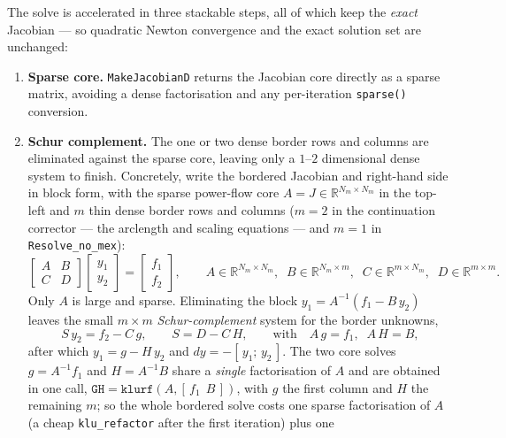\documentclass[11pt,a4paper]{article}
\newcommand{\code}[1]{\texttt{#1}}
\begin{document}
The solve is accelerated in three stackable steps, all of which keep the \emph{exact}
Jacobian --- so quadratic Newton convergence and the exact solution set are unchanged:
\begin{enumerate}[leftmargin=1.6em]
  \item \textbf{Sparse core.} \code{MakeJacobianD} returns the Jacobian core directly as a
        sparse matrix, avoiding a dense factorisation and any per-iteration \code{sparse()}
        conversion.
  \item \textbf{Schur complement.} The one or two dense border rows and columns are
        eliminated against the sparse core, leaving only a $1$--$2$ dimensional dense
        system to finish. Concretely, write the bordered Jacobian and right-hand side in
        block form, with the sparse power-flow core $A=J\in\mathbb{R}^{N_m\times N_m}$ in the
        top-left and $m$ thin dense border rows and columns ($m=2$ in the continuation
        corrector --- the arclength and scaling equations --- and $m=1$ in
        \code{Resolve_no_mex}):
        \[
          \begin{bmatrix} A & B\\[2pt] C & D \end{bmatrix}
          \begin{bmatrix} y_1\\[2pt] y_2 \end{bmatrix}
          =
          \begin{bmatrix} f_1\\[2pt] f_2 \end{bmatrix},
          \qquad
          A\in\mathbb{R}^{N_m\times N_m},\;\;
          B\in\mathbb{R}^{N_m\times m},\;\;
          C\in\mathbb{R}^{m\times N_m},\;\;
          D\in\mathbb{R}^{m\times m}.
        \]
        Only $A$ is large and sparse. Eliminating the block $y_1=A^{-1}(f_1-B\,y_2)$ leaves
        the small $m\times m$ \emph{Schur-complement} system for the border unknowns,
        \[
          S\,y_2 = f_2 - C\,g,
          \qquad
          S = D - C\,H,
          \qquad\text{with}\quad
          A\,g = f_1,\;\; A\,H = B,
        \]
        after which $y_1 = g - H\,y_2$ and $dy=-[\,y_1;\,y_2\,]$. The two core solves
        $g=A^{-1}f_1$ and $H=A^{-1}B$ share a \emph{single} factorisation of $A$ and are
        obtained in one call, $\code{GH}=\code{klurf}(A,[\,f_1\ \ B\,])$, with $g$ the first
        column and $H$ the remaining $m$; so the whole bordered solve costs one sparse
        factorisation of $A$ (a cheap \code{klu_refactor} after the first iteration) plus one

\end{enumerate}
\end{document}
